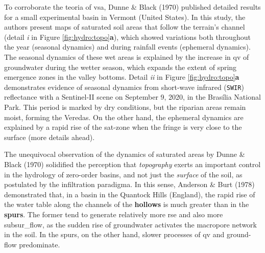 \documentclass[./main_en.tex]{subfiles}
\begin{document}
\par To corroborate the \gls{teoria} of \gls{vsa}, Dunne \& Black (1970) \cite{Dunne1970, Dunne1970b} published detailed results for a small experimental basin in Vermont (United States). In this study, the authors present maps of saturated soil areas that follow the terrain's channel (detail \textit{i} in Figure \ref{fig:hydro:topo}\textbf{a}), which showed variations both throughout the year (seasonal dynamics) and during rainfall events (ephemeral dynamics). The seasonal dynamics of these wet areas is explained by the increase in \gls{qv} of groundwater during the wetter season, which expands the extent of spring emergence zones in the valley bottoms. Detail \textit{ii} in Figure \ref{fig:hydro:topo}\textbf{a} demonstrates evidence of seasonal dynamics from short-wave infrared (\texttt{SWIR}) reflectance with a Sentinel-II scene on September 9, 2020, in the Brasília National Park. This period is marked by dry conditions, but the riparian areas remain moist, forming the Veredas. On the other hand, the ephemeral dynamics are explained by a rapid rise of the \gls{sat-zone} when the \gls{fringe} is very close to the surface (more details ahead).

\par The unequivocal observation of the dynamics of saturated areas by Dunne \& Black (1970) solidified the perception that \textit{topography} exerts an important control in the \gls{hydrology} of zero-order basins, and not just the \textit{surface} of the soil, as postulated by the infiltration \gls{paradigma}. In this sense, Anderson \& Burt (1978) \cite{Anderson1978} demonstrated that, in a basin in the Quantock Hills (England), the rapid rise of the water table along the channels of the \textbf{\gls{hollows}} is much greater than in the \textbf{\gls{spurs}}. The former tend to generate relatively more \gls{rse} and also more \gls{subsur_flow}, as the sudden rise of groundwater activates the macropore network in the soil. In the \gls{spurs}, on the other hand, slower processes of \gls{qv} and \gls{ground-flow} predominate. 
\end{document}
